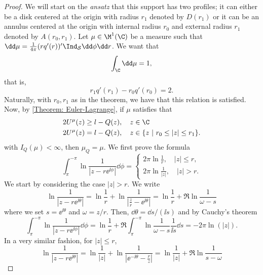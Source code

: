 \begin{proof}
	We will start on the \textit{ansatz} that this support has two profiles; it can either be a disk centered at the origin with radius $r_1$ denoted by $D(r_1)$ or it can be an annulus centered at the origin with internal radius $r_0$ and external radius $r_1$ denoted by $A(r_0, r_1)$. Let $\mu \in  \M^1(\C)$ be a measure such that $\dd \mu = \frac{1}{4\pi} (r q'(r))' \Ind_{\mathcal{S}} \dd \phi \dd r$. We want that 
	\begin{equation}
		\int_{\C} \dd \mu = 1,
	\end{equation}
	that is, 
	\begin{equation}
		r_1 q'(r_1) - r_0 q'(r_0) = 2.
	\end{equation}
	Naturally, with $r_0, r_1$ as in the theorem, we have that this relation is satisfied. Now, by \autoref{Theorem: Euler-Lagrange}, if $\mu$ satisfies that
	\begin{align}
		2 U^{\mu}(z) & \geq l - Q(z), \quad z \in \C  \\
		2 U^{\mu}(z) & = l - Q(z), \quad z \in \{z \ | \ r_0 \leq |z| \leq r_1\}.
	\end{align}
	with $I_Q(\mu) < \infty$, then $\mu_Q = \mu$. We first prove the formula
	\begin{equation}
		\int_{\pi}^{-\pi} \ln \frac{1}{|z - r\ee^{\ii \phi}|} \dd \phi =
		\begin{cases}
			2\pi \ln \frac{1}{r},  \quad |z| \leq r, \\
			2\pi \ln \frac{1}{|z|}, \quad |z| > r.
		\end{cases}
	\end{equation}
	We start by considering the case $|z| > r$. We write
	\begin{equation}
		\ln \frac{1}{|z - r\ee^{\ii \theta}|} =  \ln \frac{1}{r} + \ln \frac{1}{\left| \frac{z}{r} - \ee^{\ii \theta} \right|} =  \ln \frac{1}{r} +\Re  \ln \frac{1}{\omega - s}  
	\end{equation}
	where we set $ s = \ee^{\ii \theta}$ and $\omega = z/r$. Then, $\dd \theta =  \dd s / (\ii s)$ and by Cauchy's theorem
	\begin{equation}
			\int_{\pi}^{-\pi} \ln \frac{1}{|z - r\ee^{\ii \phi}|} \dd \phi  = \ln \frac{1}{r} + \Re \int_{\pi}^{-\pi} \ln \frac{1}{\omega - s} \frac{1}{\ii s} \dd s = - 2\pi \ln(|z|).
	\end{equation}
	In a very similar fashion, for $|z| \leq r$,
	\begin{equation}
		\ln \frac{1}{|z - r\ee^{\ii \theta}|} =  \ln \frac{1}{|z|} + \ln \frac{1}{\left|\ee^{-\ii \theta} - \frac{r}{z} \right|} =  \ln \frac{1}{|z|} +\Re  \ln \frac{1}{s - \omega}  

\end{equation}
\end{proof}
